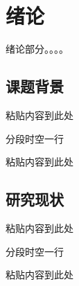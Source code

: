 \chapter{绪论}
绪论部分。。。。
\section{课题背景}
粘贴内容到此处

分段时空一行

粘贴内容到此处


\section{研究现状}
粘贴内容到此处\cite{7956190}

分段时空一行

粘贴内容到此处

